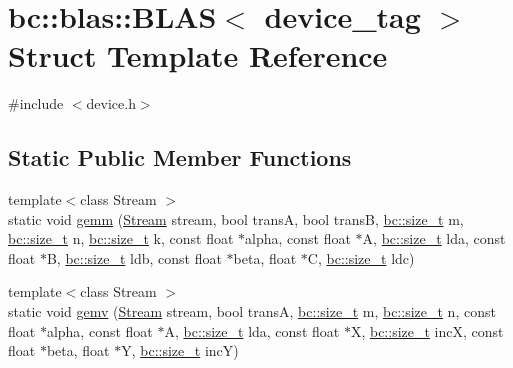 \hypertarget{structbc_1_1blas_1_1BLAS_3_01device__tag_01_4}{}\section{bc\+:\+:blas\+:\+:B\+L\+AS$<$ device\+\_\+tag $>$ Struct Template Reference}
\label{structbc_1_1blas_1_1BLAS_3_01device__tag_01_4}


{\ttfamily \#include $<$device.\+h$>$}

\subsection*{Static Public Member Functions}
\begin{DoxyCompactItemize}
\item 
{\footnotesize template$<$class Stream $>$ }\\static void \hyperlink{structbc_1_1blas_1_1BLAS_3_01device__tag_01_4_a60cfd2b05fbdfcd2d96e9c321c127c36}{gemm} (\hyperlink{classbc_1_1streams_1_1Stream}{Stream} stream, bool transA, bool transB, \hyperlink{namespacebc_aaf8e3fbf99b04b1b57c4f80c6f55d3c5}{bc\+::size\+\_\+t} m, \hyperlink{namespacebc_aaf8e3fbf99b04b1b57c4f80c6f55d3c5}{bc\+::size\+\_\+t} n, \hyperlink{namespacebc_aaf8e3fbf99b04b1b57c4f80c6f55d3c5}{bc\+::size\+\_\+t} k, const float $\ast$alpha, const float $\ast$A, \hyperlink{namespacebc_aaf8e3fbf99b04b1b57c4f80c6f55d3c5}{bc\+::size\+\_\+t} lda, const float $\ast$B, \hyperlink{namespacebc_aaf8e3fbf99b04b1b57c4f80c6f55d3c5}{bc\+::size\+\_\+t} ldb, const float $\ast$beta, float $\ast$C, \hyperlink{namespacebc_aaf8e3fbf99b04b1b57c4f80c6f55d3c5}{bc\+::size\+\_\+t} ldc)
\item 
{\footnotesize template$<$class Stream $>$ }\\static void \hyperlink{structbc_1_1blas_1_1BLAS_3_01device__tag_01_4_a5fe75f9885e4b40249c5e624cf9fe335}{gemv} (\hyperlink{classbc_1_1streams_1_1Stream}{Stream} stream, bool transA, \hyperlink{namespacebc_aaf8e3fbf99b04b1b57c4f80c6f55d3c5}{bc\+::size\+\_\+t} m, \hyperlink{namespacebc_aaf8e3fbf99b04b1b57c4f80c6f55d3c5}{bc\+::size\+\_\+t} n, const float $\ast$alpha, const float $\ast$A, \hyperlink{namespacebc_aaf8e3fbf99b04b1b57c4f80c6f55d3c5}{bc\+::size\+\_\+t} lda, const float $\ast$X, \hyperlink{namespacebc_aaf8e3fbf99b04b1b57c4f80c6f55d3c5}{bc\+::size\+\_\+t} incX, const float $\ast$beta, float $\ast$Y, \hyperlink{namespacebc_aaf8e3fbf99b04b1b57c4f80c6f55d3c5}{bc\+::size\+\_\+t} incY)

\end{DoxyCompactItemize}
